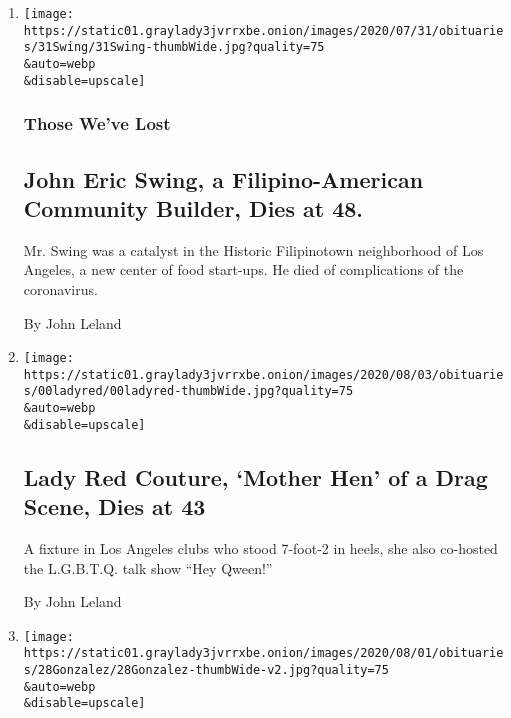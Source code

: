 \begin{enumerate}
\def\labelenumi{\arabic{enumi}.}
\item
  \href{/2020/08/03/obituaries/john-swing-dead-coronavirus.html}{}

  \texttt{[image: https://static01.graylady3jvrrxbe.onion/images/2020/07/31/obituaries/31Swing/31Swing-thumbWide.jpg?quality=75\\\&auto=webp\\\&disable=upscale]}

  \hypertarget{those-weve-lost}{%
  \subsubsection{Those We've Lost}\label{those-weve-lost}}

  \hypertarget{john-eric-swing-a-filipino-american-community-builder-dies-at-48}{%
  \subsection{John Eric Swing, a Filipino-American Community Builder,
  Dies at
  48.}\label{john-eric-swing-a-filipino-american-community-builder-dies-at-48}}

  Mr. Swing was a catalyst in the Historic Filipinotown neighborhood of
  Los Angeles, a new center of food start-ups. He died of complications
  of the coronavirus.

  By John Leland
\item
  \href{/2020/08/01/arts/lady-red-couture-dead.html}{}

  \texttt{[image: https://static01.graylady3jvrrxbe.onion/images/2020/08/03/obituaries/00ladyred/00ladyred-thumbWide.jpg?quality=75\\\&auto=webp\\\&disable=upscale]}

  \hypertarget{lady-red-couture-mother-hen-of-a-drag-scene-dies-at-43}{%
  \subsection{Lady Red Couture, `Mother Hen' of a Drag Scene, Dies at
  43}\label{lady-red-couture-mother-hen-of-a-drag-scene-dies-at-43}}

  A fixture in Los Angeles clubs who stood 7-foot-2 in heels, she also
  co-hosted the L.G.B.T.Q. talk show ``Hey Qween!''

  By John Leland
\item
  \href{/2020/07/30/obituaries/waldemar-gonzalez-dead-coronavirus.html}{}

  \texttt{[image: https://static01.graylady3jvrrxbe.onion/images/2020/08/01/obituaries/28Gonzalez/28Gonzalez-thumbWide-v2.jpg?quality=75\\\&auto=webp\\\&disable=upscale]}


\end{enumerate}

